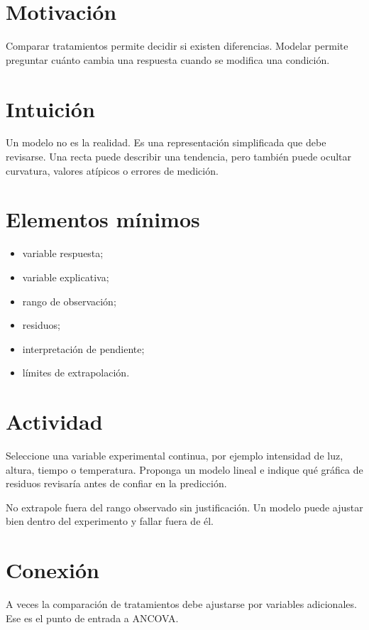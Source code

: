 
\section{Motivación}

Comparar tratamientos permite decidir si existen diferencias. Modelar permite preguntar cuánto cambia una respuesta cuando se modifica una condición.

\section{Intuición}

Un modelo no es la realidad. Es una representación simplificada que debe revisarse. Una recta puede describir una tendencia, pero también puede ocultar curvatura, valores atípicos o errores de medición.

\section{Elementos mínimos}

\begin{itemize}
  \item variable respuesta;
  \item variable explicativa;
  \item rango de observación;
  \item residuos;
  \item interpretación de pendiente;
  \item límites de extrapolación.
\end{itemize}

\section{Actividad}

Seleccione una variable experimental continua, por ejemplo intensidad de luz, altura, tiempo o temperatura. Proponga un modelo lineal e indique qué gráfica de residuos revisaría antes de confiar en la predicción.

\begin{cuidado}
No extrapole fuera del rango observado sin justificación. Un modelo puede ajustar bien dentro del experimento y fallar fuera de él.
\end{cuidado}

\section{Conexión}

A veces la comparación de tratamientos debe ajustarse por variables adicionales. Ese es el punto de entrada a ANCOVA.
